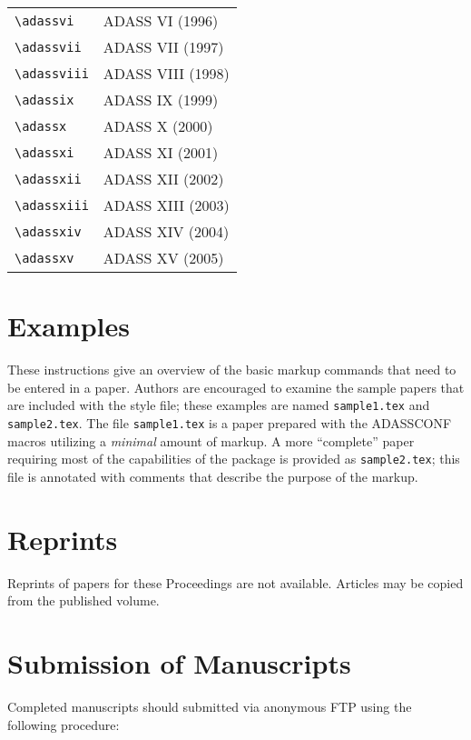 \documentclass[11pt,twoside]{article}
\def\emphasize#1{{\sl#1\/}}
\def\edcomment#1{\iffalse\marginpar{\raggedright\sl#1\/}\else\relax\fi}
\begin{document}
\begin{center}
\begin{tabular}{ll}
\verb+\adassvi+ & ADASS VI (1996)\\
\verb+\adassvii+ & ADASS VII (1997)\\
\verb+\adassviii+ & ADASS VIII (1998)\\
\verb+\adassix+ & ADASS IX (1999)\\
\verb+\adassx+ & ADASS X (2000)\\
\verb+\adassxi+ & ADASS XI (2001)\\
\verb+\adassxii+ & ADASS XII (2002)\\
\verb+\adassxiii+ & ADASS XIII (2003)\\
\verb+\adassxiv+ & ADASS XIV (2004)\\
\verb+\adassxv+ & ADASS XV (2005)\\
\end{tabular}
\end{center}

\section{Examples}

These instructions give an overview of the basic markup commands that
need to be entered in a paper. Authors are encouraged to examine the
sample papers that are included with the style file; these examples
are named \verb+sample1.tex+ and \verb+sample2.tex+.  The file
\verb+sample1.tex+ is a paper prepared with the ADASSCONF macros
utilizing a \emphasize{minimal} amount of markup. A more ``complete''
paper requiring most of the capabilities of the package is provided as
\verb+sample2.tex+; this file is annotated with comments that describe 
the purpose of the markup.

\section{Reprints}

\edcomment{Since markup matches WGAS stuff, many choices exist.}
Reprints of papers for these Proceedings are not available.  Articles
may be copied from the published volume.

\section{Submission of Manuscripts}
\label{submit}

Completed manuscripts should submitted via anonymous FTP using the
following procedure:
\end{document}
